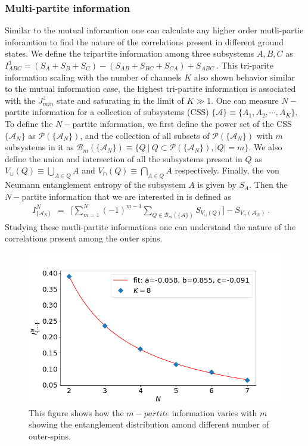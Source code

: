 \documentclass[reprint,prb,superscriptaddress]{revtex4-2}
\begin{document}
\subsubsection{Multi-partite information}
\noindent Similar to the mutual inforamtion one can calculate any higher order mutli-partie inforamtion to find the nature of the correlations present in different ground states. We define the tripartite information among three subsystems $A,B,C$ as $I^3_{ABC} = (S_A+S_B+S_C)-(S_{AB}+S_{BC}+S_{CA})+S_{ABC}~$. This tri-parite information scaling with the number of channels $K$ also shown behavior similar to the mutual information case, the highest tri-partite information is associated with the $J^z_{min}$ state and saturating in the limit of $K\gg 1$. One can measure $N-$partite information for a collection of subsystems (CSS) $\{\mathcal{A}\}\equiv\{A_1,A_2,\cdots,A_K\}$. To define the $N-$partite information, we first define the power set of the CSS $\{\mathcal{A}_N\}$ as $\mathcal{P}(\{\mathcal{A}_{N}\})$, and the collection of all subsets of $\mathcal{P}(\{\mathcal{A}_{N}\})$ with $m$ subsystems in it as $\mathcal{B}_m(\{\mathcal{A}_N\})\equiv \{ Q~| ~Q\subset \mathcal{P}(\{\mathcal{A}_{N}\}), |Q|=m \}$. We also define the union and intersection of all the subsystems present in $Q$ as ${V}_{\cup}({Q})\equiv \bigcup_{A\in Q} A$ and ${V}_{\cap}({Q})\equiv \bigcap_{A\in Q} A$ respectively. Finally, the von Neumann entanglement entropy of the subsystem $A$ is given by $S_{A} $. Then the $N-$partite information that we are interested in is defined as
\begin{eqnarray}
I^{N}_{\{\mathcal{A}_N\}} &=& \bigg[\displaystyle\sum_{m=1}^{N} (-1)^{m-1} \displaystyle\sum_{Q \in \mathcal{B}_m(\{\mathcal{A}\})} S_{V_{\cup}({Q})} \bigg]- S_{V_{\cap}(\mathcal{A}_N)}~.~~~~
\label{eq:I_N_definition}
\end{eqnarray}
Studying these mutli-partite informations one can understand the nature of the correlations present among the outer spins.
\begin{figure}
\includegraphics[scale=0.32]{plt/IN_vs_N_K8.png}
\caption{This figure shows how the $m-partite$ information varies with $m$ showing the entanglement distribution amond different number of outer-spins.}
\label{fig:Im_vs_m}
\end{figure}
\end{document}
